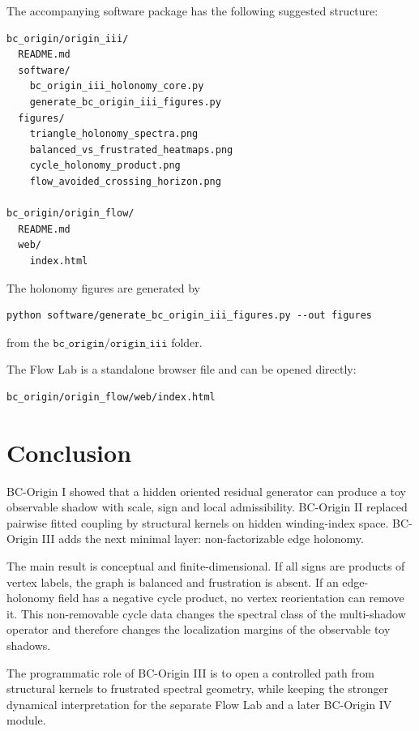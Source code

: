 \documentclass[11pt]{article}
\begin{document}
The accompanying software package has the following suggested structure:
\begin{verbatim}
bc_origin/origin_iii/
  README.md
  software/
    bc_origin_iii_holonomy_core.py
    generate_bc_origin_iii_figures.py
  figures/
    triangle_holonomy_spectra.png
    balanced_vs_frustrated_heatmaps.png
    cycle_holonomy_product.png
    flow_avoided_crossing_horizon.png

bc_origin/origin_flow/
  README.md
  web/
    index.html
\end{verbatim}

The holonomy figures are generated by
\begin{verbatim}
python software/generate_bc_origin_iii_figures.py --out figures
\end{verbatim}
from the $\texttt{bc\_origin/origin\_iii}$ folder.

The Flow Lab is a standalone browser file and can be opened directly:
\begin{verbatim}
bc_origin/origin_flow/web/index.html
\end{verbatim}

\section{Conclusion}

BC-Origin I showed that a hidden oriented residual generator can produce a toy observable shadow with scale, sign and local admissibility. BC-Origin II replaced pairwise fitted coupling by structural kernels on hidden winding-index space. BC-Origin III adds the next minimal layer: non-factorizable edge holonomy.

The main result is conceptual and finite-dimensional. If all signs are products of vertex labels, the graph is balanced and frustration is absent. If an edge-holonomy field has a negative cycle product, no vertex reorientation can remove it. This non-removable cycle data changes the spectral class of the multi-shadow operator and therefore changes the localization margins of the observable toy shadows.

The programmatic role of BC-Origin III is to open a controlled path from structural kernels to frustrated spectral geometry, while keeping the stronger dynamical interpretation for the separate Flow Lab and a later BC-Origin IV module.
\end{document}
